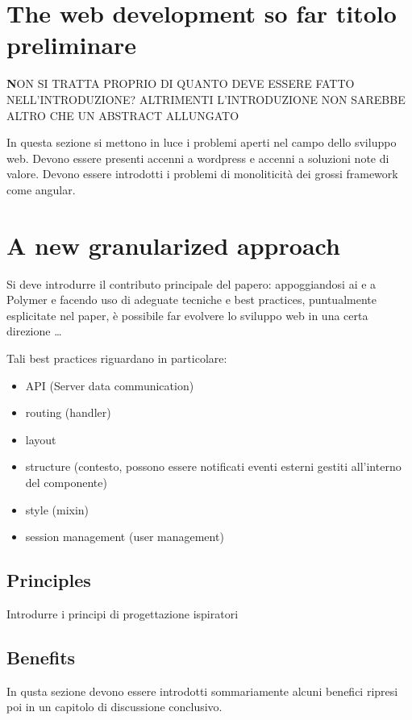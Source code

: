 \documentclass{sig-alternate-05-2015}
\begin{document}
\section{The web development so far {\secit titolo preliminare}}

{\textbf NON  SI TRATTA PROPRIO DI QUANTO DEVE ESSERE FATTO NELL'INTRODUZIONE? ALTRIMENTI L'INTRODUZIONE NON SAREBBE ALTRO CHE UN ABSTRACT ALLUNGATO}

In questa sezione si mettono in luce i problemi aperti nel campo dello sviluppo web.
Devono essere presenti accenni a wordpress e accenni a soluzioni note di valore.
Devono essere introdotti i problemi di monoliticità dei grossi framework come angular.

\section{A new granularized approach}

Si deve introdurre il contributo principale del papero: appoggiandosi ai \WC e a Polymer e facendo uso di adeguate tecniche e best practices, puntualmente esplicitate nel paper, è possibile far evolvere lo sviluppo web in una certa direzione \dots

Tali best practices riguardano in particolare:

\begin{itemize}
  \item API (Server data communication)
  \item routing (handler)
  \item layout
  \item structure (contesto, possono essere notificati eventi esterni gestiti all'interno del componente)
  \item style (mixin)
  \item session management (user management)
\end{itemize}


\subsection{Principles}
Introdurre i principi di progettazione ispiratori

\subsection{Benefits}
In qusta sezione devono essere introdotti sommariamente alcuni benefici ripresi poi in un capitolo di discussione conclusivo.
\end{document}
